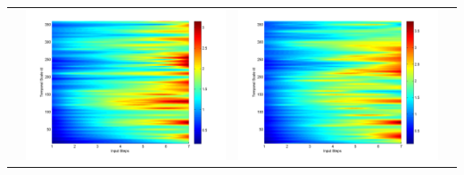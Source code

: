\documentclass[11pt]{article}
\begin{document}
\begin{table}[H]
{\begin{tabular}{cccc}
&\begin{minipage}{.3\textwidth}\includegraphics[width=\linewidth]{resultgraph/07177500pep.png}\end{minipage}
&\begin{minipage}{.3\textwidth}\includegraphics[width=\linewidth]{resultgraph/07177500pepq.png}\end{minipage} 
\\

\end{tabular}}
\end{table}
\end{document}
